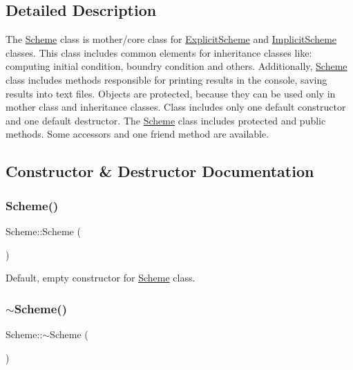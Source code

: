 \subsection{Detailed Description}
The \mbox{\hyperlink{class_scheme}{Scheme}} class is mother/core class for \mbox{\hyperlink{class_explicit_scheme}{Explicit\+Scheme}} and \mbox{\hyperlink{class_implicit_scheme}{Implicit\+Scheme}} classes. This class includes common elements for inheritance classes like\+: computing initial condition, boundry condition and others. Additionally, \mbox{\hyperlink{class_scheme}{Scheme}} class includes methods responsible for printing results in the console, saving results into text files. Objects are protected, because they can be used only in mother class and inheritance classes. Class includes only one default constructor and one default destructor. The \mbox{\hyperlink{class_scheme}{Scheme}} class includes protected and public methods. Some accessors and one friend method are available. 

\subsection{Constructor \& Destructor Documentation}
\mbox{\label{class_scheme_aa0b319a6594176dea40ca78562401b53}} 
\subsubsection{\texorpdfstring{Scheme()}{Scheme()}}
{\footnotesize\ttfamily Scheme\+::\+Scheme (\begin{DoxyParamCaption}{ }\end{DoxyParamCaption})}

Default, empty constructor for \mbox{\hyperlink{class_scheme}{Scheme}} class. \mbox{\label{class_scheme_af8f283786d3b27d97c55d92b9ae8b20b}} 
\subsubsection{\texorpdfstring{$\sim$\+Scheme()}{~Scheme()}}
{\footnotesize\ttfamily Scheme\+::$\sim$\+Scheme (\begin{DoxyParamCaption}{ }\end{DoxyParamCaption})\hspace{0.3cm}{\ttfamily [inline]}}

